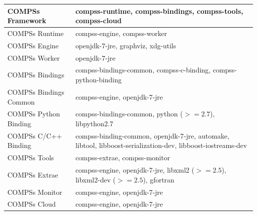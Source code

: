 \bgroup
  \def\arraystretch{1.5}
  \begin{center}
    \begin{tabular}{ p{6cm} | p{10cm} }
    COMPSs Framework 		& compss-runtime, compss-bindings, compss-tools, compss-cloud \\ \hline 
    COMPSs Runtime 		& compss-engine, compss-worker \\ \hline  
    COMPSs Engine 		& openjdk-7-jre, graphviz, xdg-utils \\ \hline 
    COMPSs Worker 		& openjdk-7-jre \\ \hline 
    COMPSs Bindings 		& compss-bindings-common, compss-c-binding, compss-python-binding \\ \hline 
    COMPSs Bindings Common 	& compss-engine, openjdk-7-jre \\ \hline 
    COMPSs Python Binding 	& compss-bindings-common, python ($>= 2.7$), libpython2.7 \\ \hline 
    COMPSs C/C++ Binding 	& compss-binding-common, openjdk-7-jre, automake, libtool, libboost-serialization-dev, libboost-iostreams-dev \\ \hline 
    COMPSs Tools 		& compss-extrae, compss-monitor \\ \hline 
    COMPSs Extrae 		& compss-engine, openjdk-7-jre, libxml2 ($>= 2.5$), libxml2-dev ($>= 2.5$), gfortran \\ \hline 
    COMPSs Monitor 		& compss-engine, openjdk-7-jre \\ \hline 
    COMPSs Cloud 		& compss-engine, openjdk-7-jre    
    \end{tabular}
  \end{center}
\egroup